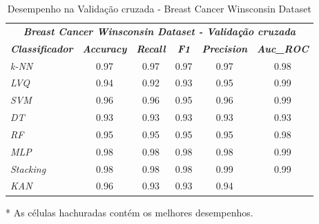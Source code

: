 \documentclass[journal]{IEEEtran}
\begin{document}
\begin{table}[h!]
	\caption{Desempenho na Validação cruzada - Breast Cancer Winsconsin Dataset}
	\label{tab:12}
	\begin{threeparttable}
		\begin{tabular}{lccccc}
			\hline
			\multicolumn{6}{c}{\textit{\textbf{Breast Cancer Winsconsin Dataset - Validação cruzada}}}                                                                                                           \\
			\multicolumn{1}{l|}{\textit{\textbf{Classificador}}} & \textit{\textbf{Accuracy}} & \textit{\textbf{Recall}}  & \textit{\textbf{F1}}      & \textit{\textbf{Precision}} & \textit{\textbf{Auc\_ROC}} \\ \hline
			\multicolumn{1}{l|}{\textit{k-NN}}                   & 0.97                       & 0.97                      & 0.97                      & 0.97                        & 0.98                       \\
			\multicolumn{1}{l|}{\textit{LVQ}}                    & 0.94                       & 0.92                      & 0.93                      & 0.95                        & \cellcolor{lightgray}0.99  \\
			\multicolumn{1}{l|}{\textit{SVM}}                    & 0.96                       & 0.96                      & 0.95                      & 0.96                        & \cellcolor{lightgray}0.99  \\
			\multicolumn{1}{l|}{\textit{DT}}                     & 0.93                       & 0.93                      & 0.93                      & 0.93                        & 0.93                       \\
			\multicolumn{1}{l|}{\textit{RF}}                     & 0.95                       & 0.95                      & 0.95                      & 0.95                        & 0.98                       \\
			\multicolumn{1}{l|}{\textit{MLP}}                    & \cellcolor{lightgray}0.98  & \cellcolor{lightgray}0.98 & \cellcolor{lightgray}0.98 & 0.98                        & \cellcolor{lightgray}0.99  \\
			\multicolumn{1}{l|}{\textit{Stacking}}               & \cellcolor{lightgray}0.98  & \cellcolor{lightgray}0.98 & \cellcolor{lightgray}0.98 & \cellcolor{lightgray}0.99   & \cellcolor{lightgray}0.99  \\
			\multicolumn{1}{l|}{\textit{KAN}}                    & 0.96                       & 0.93                      & 0.93                      & 0.94                        &                            \\
			\hline
		\end{tabular}
		\begin{tablenotes}\footnotesize
			\item[*] As células hachuradas contém os melhores desempenhos.
		\end{tablenotes}
	\end{threeparttable}
\end{table}
\end{document}
